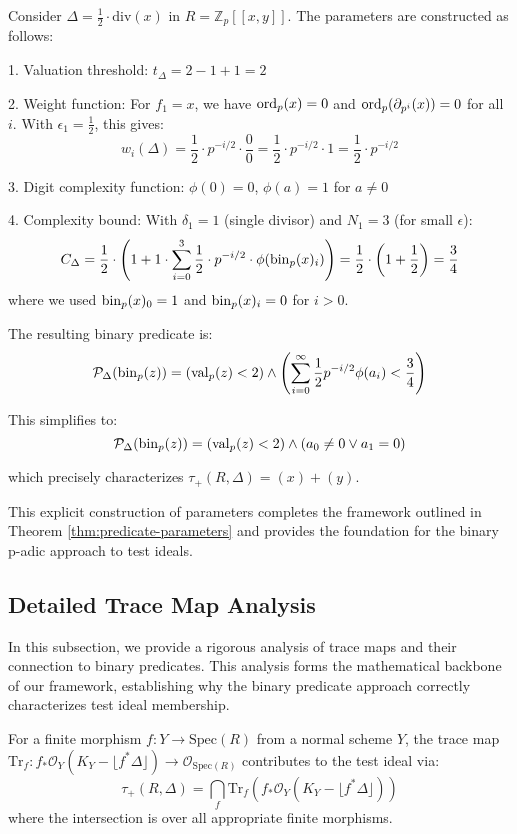 \begin{example}\label{ex:param-construction}
Consider $\Delta = \frac{1}{2} \cdot \text{div}(x)$ in $R = \mathbb{Z}_p[[x,y]]$. The parameters are constructed as follows:

1. Valuation threshold: $t_\Delta = 2 - 1 + 1 = 2$

2. Weight function: For $f_1 = x$, we have $\operatorname{ord}_p(x) = 0$ and $\operatorname{ord}_p(\partial_{p^i}(x)) = 0$ for all $i$. With $\epsilon_1 = \frac{1}{2}$, this gives:
$$w_i(\Delta) = \frac{1}{2} \cdot p^{-i/2} \cdot \frac{0}{0} = \frac{1}{2} \cdot p^{-i/2} \cdot 1 = \frac{1}{2} \cdot p^{-i/2}$$

3. Digit complexity function: $\phi(0) = 0$, $\phi(a) = 1$ for $a \neq 0$

4. Complexity bound: With $\delta_1 = 1$ (single divisor) and $N_1 = 3$ (for small $\epsilon$):
$$C_\Delta = \frac{1}{2} \cdot \left(1 + 1 \cdot \sum_{i=0}^{3} \frac{1}{2} \cdot p^{-i/2} \cdot \phi(\operatorname{bin}_p(x)_i) \right) = \frac{1}{2} \cdot \left(1 + \frac{1}{2} \right) = \frac{3}{4}$$
where we used $\operatorname{bin}_p(x)_0 = 1$ and $\operatorname{bin}_p(x)_i = 0$ for $i > 0$.

The resulting binary predicate is:
$$\mathcal{P}_\Delta(\operatorname{bin}_p(z)) = (\operatorname{val}_p(z) < 2) \wedge \left(\sum_{i=0}^{\infty} \frac{1}{2} p^{-i/2} \phi(a_i) < \frac{3}{4}\right)$$

This simplifies to:
$$\mathcal{P}_\Delta(\operatorname{bin}_p(z)) = (\operatorname{val}_p(z) < 2) \wedge (a_0 \neq 0 \vee a_1 = 0)$$

which precisely characterizes $\tau_+(R,\Delta) = (x) + (y)$.
\end{example}

This explicit construction of parameters completes the framework outlined in Theorem \ref{thm:predicate-parameters} and provides the foundation for the binary p-adic approach to test ideals.

\subsection{Detailed Trace Map Analysis}

In this subsection, we provide a rigorous analysis of trace maps and their connection to binary predicates. This analysis forms the mathematical backbone of our framework, establishing why the binary predicate approach correctly characterizes test ideal membership.

\begin{definition}\label{def:trace-map}
For a finite morphism $f: Y \to \text{Spec}(R)$ from a normal scheme $Y$, the trace map $\text{Tr}_f: f_*\mathcal{O}_Y(K_Y - \lfloor f^*\Delta\rfloor) \to \mathcal{O}_{\text{Spec}(R)}$ contributes to the test ideal via:
$$\tau_+(R,\Delta) = \bigcap_{f} \text{Tr}_f(f_*\mathcal{O}_Y(K_Y - \lfloor f^*\Delta\rfloor))$$
where the intersection is over all appropriate finite morphisms.
\end{definition}

